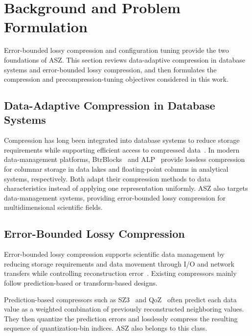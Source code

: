\section{Background and Problem Formulation}
\label{sec:background}

Error-bounded lossy compression and configuration tuning provide the two foundations of ASZ. This section reviews data-adaptive compression in database systems and error-bounded lossy compression, and then formulates the compression and precompression-tuning objectives considered in this work.

\subsection{Data-Adaptive Compression in Database Systems}
\label{sec:background:database}

Compression has long been integrated into database systems to reduce storage requirements while supporting efficient access to compressed data~\cite{li1987compression}. In modern data-management platforms, BtrBlocks~\cite{kuschewski2023btrblocks} and ALP~\cite{afroozeh2023alp} provide lossless compression for columnar storage in data lakes and floating-point columns in analytical systems, respectively. Both adapt their compression methods to data characteristics instead of applying one representation uniformly. ASZ also targets data-management systems, providing error-bounded lossy compression for multidimensional scientific fields.

\subsection{Error-Bounded Lossy Compression}
\label{sec:background:compression}

Error-bounded lossy compression supports scientific data management by reducing storage requirements and data movement through I/O and network transfers while controlling reconstruction error~\cite{cappello2019use,di2025survey}. Existing compressors mainly follow prediction-based or transform-based designs.

Prediction-based compressors such as SZ3~\cite{zhao2021optimizing,liang2022sz3} and QoZ~\cite{liu2022dynamic,liu2024high} often predict each data value as a weighted combination of previously reconstructed neighboring values. They then quantize the prediction errors and losslessly compress the resulting sequence of quantization-bin indices. ASZ also belongs to this class.

